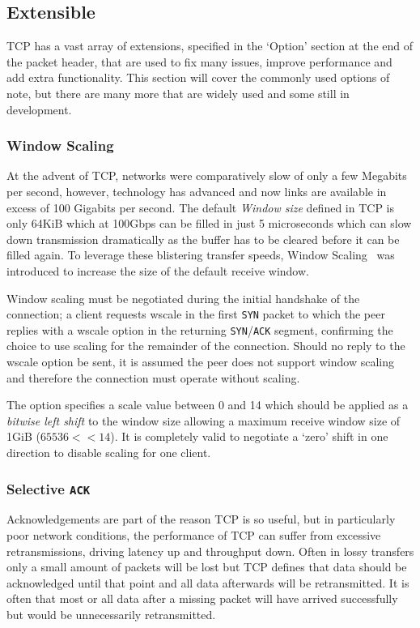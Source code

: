 \documentclass[11pt,a4paper,british]{bhamarticle}
\begin{document}
\begin{multicols}{2}
\subsection{Extensible}
TCP has a vast array of extensions, specified in the `Option' section at the end of the packet header, that are used to fix many issues, improve performance and add extra functionality. This section will cover the commonly used options of note, but there are many more that are widely used and some still in development.

\subsubsection{Window Scaling}
At the advent of TCP, networks were comparatively slow of only a few Megabits per second, however, technology has advanced and now links are available in excess of 100 Gigabits per second. The default \textit{Window size} defined in TCP is only 64KiB which at 100Gbps can be filled in just 5 microseconds which can slow down transmission dramatically as the buffer has to be cleared before it can be filled again. To leverage these blistering transfer speeds, Window Scaling~\cite[2]{rfc1323} was introduced to increase the size of the default receive window. 

Window scaling must be negotiated during the initial handshake of the connection; a client requests wscale in the first \texttt{SYN} packet to which the peer replies with a wscale option in the returning \texttt{SYN}/\texttt{ACK} segment, confirming the choice to use scaling for the remainder of the connection. Should no reply to the wscale option be sent, it is assumed the peer does not support window scaling and therefore the connection must operate without scaling.

The option specifies a scale value between 0 and 14 which should be applied as a \textit{bitwise left shift} to the window size allowing a maximum receive window size of 1GiB ($65536 << 14$). It is completely valid to negotiate a `zero' shift in one direction to disable scaling for one client.

\subsubsection{Selective \texttt{ACK}}\label{sec:sack}
Acknowledgements are part of the reason TCP is so useful, but in particularly poor network conditions, the performance of TCP can suffer from excessive retransmissions, driving latency up and throughput down. Often in lossy transfers only a small amount of packets will be lost but TCP defines that data should be acknowledged until that point and all data afterwards will be retransmitted. It is often that most or all data after a missing packet will have arrived successfully but would be unnecessarily retransmitted.


\end{multicols}
\end{document}

